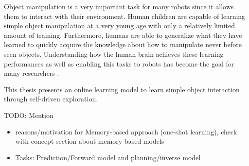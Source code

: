 Object manipulation is a very important task for many robots since it allows 
them to interact with their environment. Human children are capable of learning 
simple object manipulation at a very young age with only a relatively limited 
amount of training. %
Furthermore, humans are able to generalize what they have learned to quickly 
acquire the knowledge about how to manipulate never before seen objects. 
Understanding how the human brain achieves these learning performances as well 
as enabling this tasks to robots has become the goal for many researchers 
\cite{list_of_object_manipulation}. %

This thesis presents an online learning model to learn simple object interaction through self-driven exploration.

TODO: Mention
\begin{itemize}
\item reasons/motivation for Memory-based approach (one-shot learning), check 
with concept section about memory based models
\item Tasks: Prediction/Forward model and planning/inverse model

\end{itemize}


